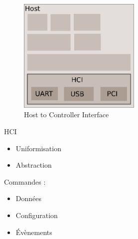 \begin{frame}
\begin{minipage}[t]{0.60\linewidth}
	\begin{figure}
		\includegraphics[height=5.5cm]{arch_log_hci.png}
		\caption{Host to Controller Interface}
	\end{figure}
\end{minipage}
\begin{minipage}[t]{0.30\linewidth}
	\begin{block}{HCI}
		\begin{itemize}
			\item Uniformisation
			\item Abstraction
		\end{itemize}
		Commandes : 
		\begin{itemize}
			\item Données
			\item Configuration
			\item Évènements
		\end{itemize}
	\end{block}
\end{minipage}

\end{frame}
